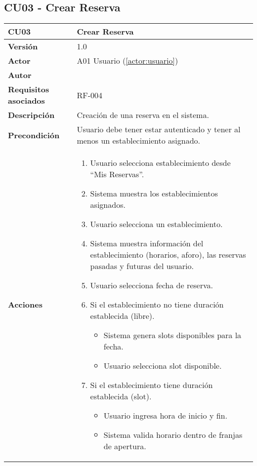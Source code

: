 \subsection{CU03 - Crear Reserva}

\begin{table}[H]
	\centering
	\begin{tabularx}{\linewidth}{ p{} p{} }
		\toprule
		\textbf{CU03}    & \textbf{Crear Reserva} \\
		\toprule
		\textbf{Versión}              & 1.0    \\
		\textbf{Actor}                & A01 Usuario (\ref{actor:usuario}) \\
		\textbf{Autor}                & \nombre \\
		\textbf{Requisitos asociados} & RF-004 \\
		\textbf{Descripción}          & Creación de una reserva en el sistema. \\
		\textbf{Precondición}         & Usuario debe tener estar autenticado y tener al menos un establecimiento asignado. \\
		\textbf{Acciones}             &
		\begin{enumerate}
			\def\labelenumi{\arabic{enumi}.}
			\tightlist
			\item Usuario selecciona establecimiento desde ``Mis Reservas''.
            \item Sistema muestra los establecimientos asignados.
            \item Usuario selecciona un establecimiento.
            \item Sistema muestra información del establecimiento (horarios, aforo), las reservas pasadas y futuras del usuario.
            \item Usuario selecciona fecha de reserva.
            \item Si el establecimiento no tiene duración establecida (libre).
   		\begin{itemize}
  			\item Sistema genera slots disponibles para la fecha.
			  \item Usuario selecciona slot disponible.
  		\end{itemize}
            \item Si el establecimiento tiene duración establecida (slot).
   		\begin{itemize}
  			\item Usuario ingresa hora de inicio y fin.
			  \item Sistema valida horario dentro de franjas de apertura.

\end{itemize}
\end{enumerate}
\end{tabularx}
\end{table}
